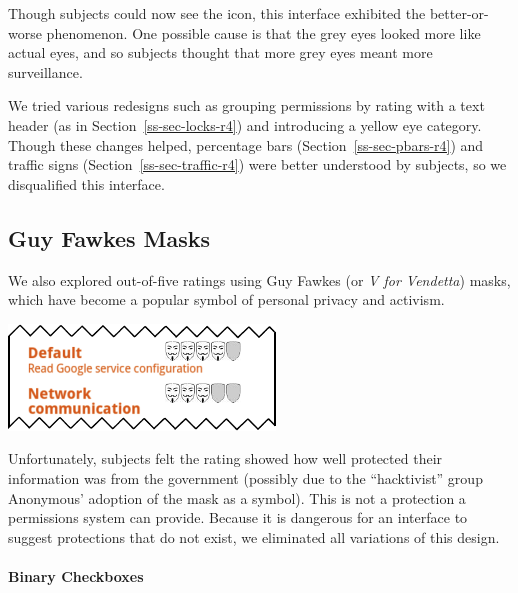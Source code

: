 \documentclass[11pt]{article}
\newcommand{\refsec}[1]{Section~\ref{#1}}
\begin{document}
Though subjects could now see the icon, this interface exhibited 
the better-or-worse phenomenon. One possible cause is that 
the grey eyes looked more like actual eyes, and so subjects thought that more 
grey eyes meant more surveillance. 

We tried various redesigns such as grouping permissions by rating with a
text header (as 
in \refsec{ss-sec-locks-r4}) and introducing a yellow eye category. Though these changes helped, 
percentage bars (\refsec{ss-sec-pbars-r4}) and traffic signs 
(\refsec{ss-sec-traffic-r4}) were better understood by subjects,
so we disqualified this interface.

\subsection{Guy Fawkes Masks}
\label{s-sec-masks}

We also explored out-of-five ratings using 
Guy Fawkes (or \emph{V for Vendetta}) masks, which have become a popular symbol of personal
privacy and activism.
\label{ss-sec-masks-r1}
\begin{center}
\includegraphics[width=.5\linewidth]{candidate-img/masks/masksR1.png}
\end{center}
Unfortunately, subjects felt the
rating showed how well protected their information was from the government 
(possibly due to the ``hacktivist'' group Anonymous' adoption of the mask as a symbol). 
This is not a protection a permissions system can provide. Because it is dangerous for an
interface to suggest protections that do not exist, we eliminated all
variations of this design.

\paragraph{Binary Checkboxes}
\label{s-sec-checkbox}
\end{document}
